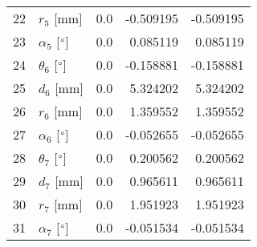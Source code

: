 \documentclass{standalone}%
\begin{document}
\begin{tabular}{llrrr}
22 &              $r_{5}$ [mm] &      0.0 &  -0.509195 &  -0.509195 \\
23 &  $\alpha_{5}$ [$\degree$] &      0.0 &   0.085119 &   0.085119 \\
24 &  $\theta_{6}$ [$\degree$] &      0.0 &  -0.158881 &  -0.158881 \\
25 &              $d_{6}$ [mm] &      0.0 &   5.324202 &   5.324202 \\
26 &              $r_{6}$ [mm] &      0.0 &   1.359552 &   1.359552 \\
27 &  $\alpha_{6}$ [$\degree$] &      0.0 &  -0.052655 &  -0.052655 \\
28 &  $\theta_{7}$ [$\degree$] &      0.0 &   0.200562 &   0.200562 \\
29 &              $d_{7}$ [mm] &      0.0 &   0.965611 &   0.965611 \\
30 &              $r_{7}$ [mm] &      0.0 &   1.951923 &   1.951923 \\
31 &  $\alpha_{7}$ [$\degree$] &      0.0 &  -0.051534 &  -0.051534 \\
\bottomrule
\end{tabular}
%
\end{document}
